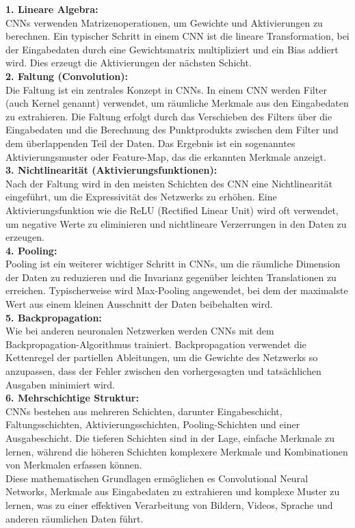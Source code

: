\documentclass[12pt]{article}
\begin{document}
\textbf{1. Lineare Algebra:}\\
CNNs verwenden Matrizenoperationen, um Gewichte und Aktivierungen zu berechnen. Ein typischer Schritt in einem CNN ist die lineare Transformation, bei der Eingabedaten durch eine Gewichtsmatrix multipliziert und ein Bias addiert wird. Dies erzeugt die Aktivierungen der nächsten Schicht.\\
\textbf{2. Faltung (Convolution):}\\
Die Faltung ist ein zentrales Konzept in CNNs. In einem CNN werden Filter (auch Kernel genannt) verwendet, um räumliche Merkmale aus den Eingabedaten zu extrahieren. Die Faltung erfolgt durch das Verschieben des Filters über die Eingabedaten und die Berechnung des Punktprodukts zwischen dem Filter und dem überlappenden Teil der Daten. Das Ergebnis ist ein sogenanntes Aktivierungsmuster oder Feature-Map, das die erkannten Merkmale anzeigt.\\
\textbf{3. Nichtlinearität (Aktivierungsfunktionen):}\\
Nach der Faltung wird in den meisten Schichten des CNN eine Nichtlinearität eingeführt, um die Expressivität des Netzwerks zu erhöhen. Eine Aktivierungsfunktion wie die ReLU (Rectified Linear Unit) wird oft verwendet, um negative Werte zu eliminieren und nichtlineare Verzerrungen in den Daten zu erzeugen.\\
\textbf{4. Pooling:}\\
Pooling ist ein weiterer wichtiger Schritt in CNNs, um die räumliche Dimension der Daten zu reduzieren und die Invarianz gegenüber leichten Translationen zu erreichen. Typischerweise wird Max-Pooling angewendet, bei dem der maximalste Wert aus einem kleinen Ausschnitt der Daten beibehalten wird.\\
\textbf{5. Backpropagation:}\\
Wie bei anderen neuronalen Netzwerken werden CNNs mit dem Backpropagation-Algorithmus trainiert. Backpropagation verwendet die Kettenregel der partiellen Ableitungen, um die Gewichte des Netzwerks so anzupassen, dass der Fehler zwischen den vorhergesagten und tatsächlichen Ausgaben minimiert wird.\\
\textbf{6. Mehrschichtige Struktur:}\\
CNNs bestehen aus mehreren Schichten, darunter Eingabeschicht, Faltungsschichten, Aktivierungsschichten, Pooling-Schichten und einer Ausgabeschicht. Die tieferen Schichten sind in der Lage, einfache Merkmale zu lernen, während die höheren Schichten komplexere Merkmale und Kombinationen von Merkmalen erfassen können.
\\
Diese mathematischen Grundlagen ermöglichen es Convolutional Neural Networks, Merkmale aus Eingabedaten zu extrahieren und komplexe Muster zu lernen, was zu einer effektiven Verarbeitung von Bildern, Videos, Sprache und anderen räumlichen Daten führt.
\end{document}
